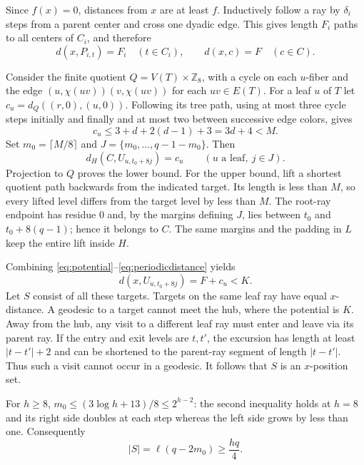 \documentclass[11pt]{article}
\theoremstyle{remark}\newtheorem{remark}[theorem]{Remark}
\newcommand{\Z}{\mathbb Z}
\begin{document}
Since $f(x)=0$, distances from $x$ are at least $f$. Inductively follow a
ray by $\delta_i$ steps from a parent center and cross one dyadic edge.
This gives length $F_i$ paths to all centers of $C_i$, and therefore
\begin{equation}\label{eq:centerdist}
 d(x,P_{i,t})=F_i\quad(t\in C_i),\qquad d(x,c)=F\quad(c\in C).
\end{equation}

Consider the finite quotient $Q=V(T)\times\Z_8$, with a cycle on each
$u$-fiber and the edge $(u,\chi(uv))(v,\chi(uv))$ for each $uv\in E(T)$.
For a leaf $u$ of $T$ let $c_u=d_Q((r,0),(u,0))$. Following its tree path,
using at most three cycle steps initially and finally and at most two
between successive edge colors, gives
\[
 c_u\le3+d+2(d-1)+3=3d+4<M.
\]
Set $m_0=\lceil M/8\rceil$ and $J=\{m_0,\ldots,q-1-m_0\}$. Then
\begin{equation}\label{eq:periodicdistance}
 d_H(C,U_{u,t_0+8j})=c_u\qquad(u\text{ a leaf},\ j\in J).
\end{equation}
Projection to $Q$ proves the lower bound. For the upper bound, lift a shortest
quotient path backwards from the indicated target. Its length is less than
$M$, so every lifted level differs from the target level by less than $M$.
The root-ray endpoint has residue $0$ and, by the margins defining $J$, lies
between $t_0$ and $t_0+8(q-1)$; hence it belongs to $C$. The same margins and
the padding in $L$ keep the entire lift inside $H$.

Combining \eqref{eq:potential}--\eqref{eq:periodicdistance} yields
\[
 d(x,U_{u,t_0+8j})=F+c_u<K.
\]
Let $S$ consist of all these targets. Targets on the same leaf ray have
equal $x$-distance. A geodesic to a target cannot meet the hub, where the
potential is $K$. Away from the hub, any visit to a different leaf ray must
enter and leave via its parent ray. If the entry and exit levels are $t,t'$,
the excursion has length at least $|t-t'|+2$ and can be shortened to the
parent-ray segment of length $|t-t'|$. Thus such a visit cannot occur in a
geodesic. It follows that $S$ is an $x$-position set.

For $h\ge8$, $m_0\le(3\log h+13)/8\le2^{h-2}$: the second inequality holds
at $h=8$ and its right side doubles at each step whereas the left side grows
by less than one. Consequently
\begin{equation}\label{eq:targetsize}
 |S|=\ell(q-2m_0)\ge\frac{hq}{4}.
\end{equation}
\end{document}
